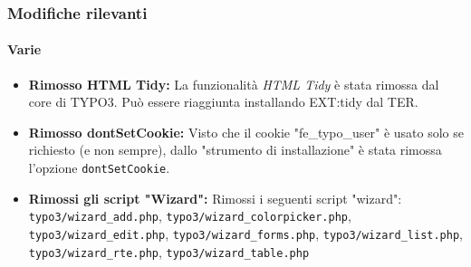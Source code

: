 \begin{frame}[fragile]
        \frametitle{Modifiche rilevanti}
        \framesubtitle{Varie}

        \begin{itemize}

                \item \textbf{Rimosso HTML Tidy:}\newline
                        \small
                                La funzionalità \textit{HTML Tidy} è stata rimossa dal core di TYPO3. Può essere riaggiunta installando EXT:tidy dal TER.
                        \normalsize

                \item \textbf{Rimosso dontSetCookie:}\newline
                        \small
				Visto che il cookie "fe\_typo\_user" è usato solo se richiesto (e non sempre), dallo "strumento di installazione" è stata rimossa l'opzione \texttt{dontSetCookie}.
                        \normalsize

                \item \textbf{Rimossi gli script "Wizard":}\newline
                        \small
                                Rimossi i seguenti script "wizard":
                                \texttt{typo3/wizard\_add.php}, \texttt{typo3/wizard\_colorpicker.php}, \texttt{typo3/wizard\_edit.php}, \texttt{typo3/wizard\_forms.php}, \texttt{typo3/wizard\_list.php}, \texttt{typo3/wizard\_rte.php}, \texttt{typo3/wizard\_table.php}
                        \normalsize

        \end{itemize}

\end{frame}


